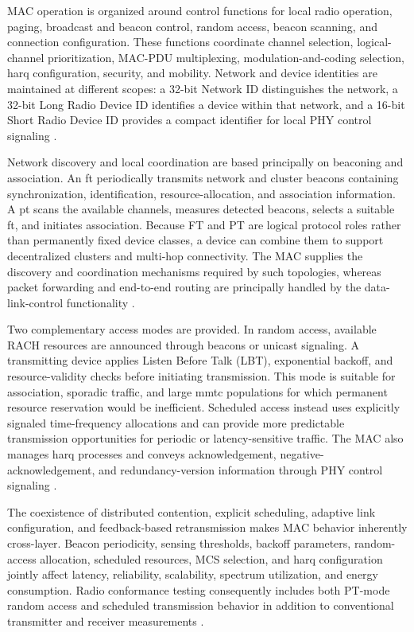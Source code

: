 MAC operation is organized around control functions for local radio operation, paging, broadcast and beacon control, random access, beacon scanning, and connection configuration. These functions coordinate channel selection, logical-channel prioritization, MAC-PDU multiplexing, modulation-and-coding selection, \gls{harq} configuration, security, and mobility. Network and device identities are maintained at different scopes: a 32-bit Network ID distinguishes the network, a 32-bit Long Radio Device ID identifies a device within that network, and a 16-bit Short Radio Device ID provides a compact identifier for local PHY control signaling \cite{etsi_ts_103636_4_r2}.

Network discovery and local coordination are based principally on beaconing and association. An \gls{ft} periodically transmits network and cluster beacons containing synchronization, identification, resource-allocation, and association information. A \gls{pt} scans the available channels, measures detected beacons, selects a suitable \gls{ft}, and initiates association. Because FT and PT are logical protocol roles rather than permanently fixed device classes, a device can combine them to support decentralized clusters and multi-hop connectivity. The MAC supplies the discovery and coordination mechanisms required by such topologies, whereas packet forwarding and end-to-end routing are principally handled by the data-link-control functionality \cite{etsi_ts103636_1,etsi_ts103636_4, etsi_ts_103636_1_r2,etsi_ts_103636_4_r2}.

Two complementary access modes are provided. In random access, available RACH resources are announced through beacons or unicast signaling. A transmitting device applies Listen Before Talk (LBT), exponential backoff, and resource-validity checks before initiating transmission. This mode is suitable for association, sporadic traffic, and large \gls{mmtc} populations for which permanent resource reservation would be inefficient. Scheduled access instead uses explicitly signaled time-frequency allocations and can provide more predictable transmission opportunities for periodic or latency-sensitive traffic. The MAC also manages \gls{harq} processes and conveys acknowledgement, negative-acknowledgement, and redundancy-version information through PHY control signaling \cite{etsi_ts103636_4,etsi_ts_103636_4_r2}.

The coexistence of distributed contention, explicit scheduling, adaptive link configuration, and feedback-based retransmission makes MAC behavior inherently cross-layer. Beacon periodicity, sensing thresholds, backoff parameters, random-access allocation, scheduled resources, MCS selection, and \gls{harq} configuration jointly affect latency, reliability, scalability, spectrum utilization, and energy consumption. Radio conformance testing consequently includes both PT-mode random access and scheduled transmission behavior in addition to conventional transmitter and receiver measurements \cite{etsi_ts_103776}.

